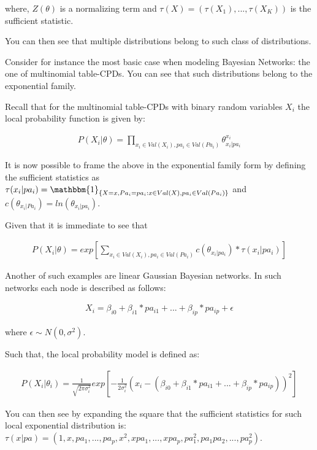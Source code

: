 \documentclass[11pt]{article}
\begin{document}
\begin{article}
where, \(Z(\theta)\) is a normalizing term and \(\tau(X) = (\tau(X_1),
  ..., \tau(X_K))\) is the sufficient statistic.

You can then see that multiple distributions belong to such class
of distributions.

Consider for instance the most basic case when modeling Bayesian
Networks: the one of multinomial table-CPDs. You can see that
such distributions belong to the exponential family.

Recall that for the multinomial table-CPDs with binary random variables \(X_i\) the
local probability function is given by:

\begin{align} \label{eq:multinomial-cpd}
P(X_i|\theta) = \prod_{x_i \in Val(X_i), pa_i \in Val(Pa_i)} \theta_{x_i | pa_i}^{x_i}
\end{align}

It is now possible to frame the above in the exponential family form by
defining the sufficient statistics as \(\tau(x_i | pa_i) =
  \mathbbm{1}_{\{X = x, Pa_i = pa_i : x \in Val(X), pa_i \in
  Val(Pa_i)\}}\) and \(c(\theta_{x_i | Pa_i}) = ln(\theta_{x_i |
  pa_i})\).

Given that it is immediate to see that

\begin{align} \label{eq:multinomial-cpd}
P(X_i|\theta) = exp[\sum_{x_i \in Val(X_i), pa_i \in Val(Pa_i)} c(\theta_{x_i | pa_i}) * \tau(x_i | pa_i)] 
\end{align}

Another of such examples are linear Gaussian Bayesian networks. In
such networks each node is described as follows:

\begin{align} \label{eq:local-prob-model}
X_i = \beta_{i0} + \beta_{i1} * pa_{i1} + ... + \beta_{ip} * pa_{ip} + \epsilon
\end{align}

where \(\epsilon \sim N(0,\sigma^2)\).

Such that, the local probability model is defined as:

\begin{align} \label{eq:gaussian-cpd}
P(X_i|\theta_i) = \frac{1}{\sqrt{2\pi\sigma_i^2}} exp[-\frac{1}{2\sigma_i^2} (x_i - (\beta_{i0} + \beta_{i1} * pa_{i1} + ... + \beta_{ip} * pa_{ip}))^2] 
\end{align}

You can then see by expanding the square that the sufficient
statistics for such local exponential distribution is: \(\tau(x|pa) =
  (1,x,pa_1, ..., pa_p, x^2, xpa_1, . . . , xpa_p, pa_1^2, pa_1pa_2,
  . . . , pa_p^2)\).


\end{article}
\end{document}
